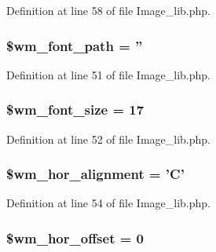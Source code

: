 Definition at line 58 of file Image\-\_\-lib.\-php.

\hypertarget{class_c_i___image__lib_a6870985f3e6bbf1a29e5875c054598f4}{
\subsubsection[{\$wm\-\_\-font\-\_\-path}]{\setlength{\rightskip}{0pt plus 5cm}\$wm\-\_\-font\-\_\-path = ''}}\label{class_c_i___image__lib_a6870985f3e6bbf1a29e5875c054598f4}


Definition at line 51 of file Image\-\_\-lib.\-php.

\hypertarget{class_c_i___image__lib_a0ea2a2f73623aa0631670017a4e68419}{
\subsubsection[{\$wm\-\_\-font\-\_\-size}]{\setlength{\rightskip}{0pt plus 5cm}\$wm\-\_\-font\-\_\-size = 17}}\label{class_c_i___image__lib_a0ea2a2f73623aa0631670017a4e68419}


Definition at line 52 of file Image\-\_\-lib.\-php.

\hypertarget{class_c_i___image__lib_a74d790b77baa0c22cd0b812abc41765c}{
\subsubsection[{\$wm\-\_\-hor\-\_\-alignment}]{\setlength{\rightskip}{0pt plus 5cm}\$wm\-\_\-hor\-\_\-alignment = '{\bf C}'}}\label{class_c_i___image__lib_a74d790b77baa0c22cd0b812abc41765c}


Definition at line 54 of file Image\-\_\-lib.\-php.

\hypertarget{class_c_i___image__lib_aed778e3e9ecb74e8c61d8c4894581f7f}{
\subsubsection[{\$wm\-\_\-hor\-\_\-offset}]{\setlength{\rightskip}{0pt plus 5cm}\$wm\-\_\-hor\-\_\-offset = 0}}\label{class_c_i___image__lib_aed778e3e9ecb74e8c61d8c4894581f7f}


